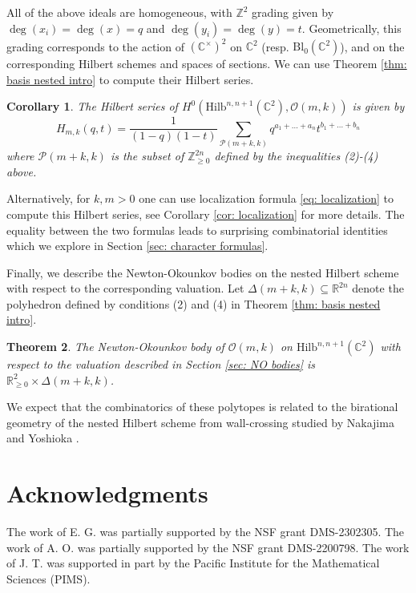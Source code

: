 \documentclass[12pt]{amsart}
\newcommand{\Hilb}{\mathrm{Hilb}}
\newcommand{\C}{\mathbb{C}}
\newcommand{\Z}{\mathbb{Z}}
\newcommand{\R}{\mathbb{R}}
\newcommand{\CO}{\mathcal{O}}
\newcommand{\Bl}{\mathrm{Bl}}
\numberwithin{equation}{section}
\newtheorem{theorem}{Theorem}[section]
\newtheorem{corollary}[theorem]{Corollary}
\theoremstyle{definition}
\begin{document}
All of the above ideals are homogeneous, with $\Z^2$ grading given by $\deg(x_i)=\deg(x)=q$ and $\deg(y_i)=\deg(y)=t$. Geometrically, this grading corresponds to the action of $(\C^{\times})^2$ on $\C^2$ (resp. $\Bl_0(\C^2)$), and on the corresponding Hilbert schemes and spaces of sections.
We can use Theorem \ref{thm: basis nested intro} to compute their Hilbert series.

\begin{corollary}
The Hilbert series of $H^0\left(\Hilb^{n,n+1}(\C^2),\CO(m,k)\right)$ is given by 
$$
H_{m,k}(q,t)=\frac{1}{(1-q)(1-t)}\sum_{\mathcal{P}(m+k,k)}q^{a_1+\ldots+a_n}t^{b_1+\ldots+b_n}
$$
where $\mathcal{P}(m+k,k)$ is the subset of $\Z_{\ge 0}^{2n}$ defined by the inequalities (2)-(4) above.
\end{corollary}

Alternatively, for $k,m>0$ one can use localization formula \eqref{eq: localization} to compute this Hilbert series, see Corollary \ref{cor: localization} for more details. The equality between the two formulas leads to surprising combinatorial identities which we explore in Section \ref{sec: character formulas}.

Finally, we describe the Newton-Okounkov bodies on the nested Hilbert scheme with respect to the corresponding valuation. Let $\Delta(m+k,k)\subseteq \R^{2n}$ denote the polyhedron defined by conditions (2) and (4) in Theorem \ref{thm: basis nested intro}. 

\begin{theorem}
    The Newton-Okounkov body of $\CO(m,k)$ on $\Hilb^{n,n+1}(\C^2)$ with respect to the valuation described in Section \ref{sec: NO bodies} is $\R_{\geq 0}^2\times \Delta(m+k,k)$.
\end{theorem}

We expect that the combinatorics of these polytopes is related to the birational geometry of the nested Hilbert scheme from wall-crossing studied by Nakajima and Yoshioka \cite{NY}.


\section*{Acknowledgments}

The work of E. G. was partially supported by the NSF grant DMS-2302305. The work of A. O. was partially supported by the NSF grant DMS-2200798.
The work of J. T. was supported in part by the Pacific Institute for the Mathematical Sciences  (PIMS).

\end{document}
